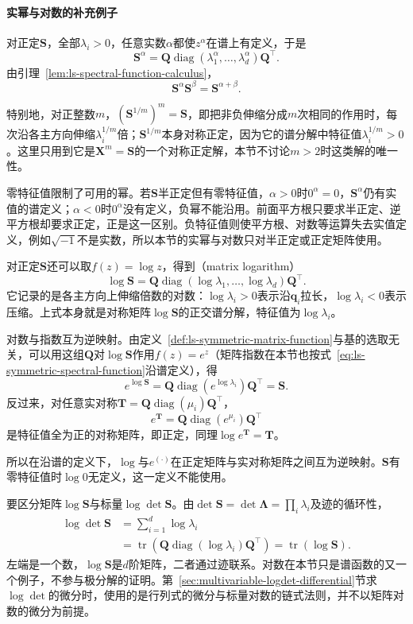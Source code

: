 \paragraph{实幂与对数的补充例子}

对正定$\bm S$，全部$\lambda_i>0$，任意实数$\alpha$都使$z^\alpha$在谱上有定义，于是
\[
 \bm S^\alpha=\bm Q\operatorname{diag}(\lambda_1^\alpha,\ldots,\lambda_d^\alpha)\bm Q^\top .
\]
由引理~\ref{lem:ls-spectral-function-calculus}，
\[
 \bm S^\alpha\bm S^\beta=\bm S^{\alpha+\beta}.
\]

特别地，对正整数$m$，$(\bm S^{1/m})^m=\bm S$，即把非负伸缩分成$m$次相同的作用时，每次沿各主方向伸缩$\lambda_i^{1/m}$倍；$\bm S^{1/m}$本身对称正定，因为它的谱分解中特征值$\lambda_i^{1/m}>0$。这里只用到它是$\bm X^m=\bm S$的一个对称正定解，本节不讨论$m>2$时这类解的唯一性。

零特征值限制了可用的幂。若$\bm S$半正定但有零特征值，$\alpha>0$时$0^\alpha=0$，$\bm S^\alpha$仍有实值的谱定义；$\alpha<0$时$0^\alpha$没有定义，负幂不能沿用。前面平方根只要求半正定、逆平方根却要求正定，正是这一区别。负特征值则使平方根、对数等运算失去实值定义，例如$\sqrt{-1}$不是实数，所以本节的实幂与对数只对半正定或正定矩阵使用。

对正定$\bm S$还可以取$f(z)=\log z$，得到（matrix logarithm）
\[
 \log\bm S=\bm Q\operatorname{diag}(\log\lambda_1,\ldots,\log\lambda_d)\bm Q^\top .
\]
它记录的是各主方向上伸缩倍数的对数：$\log\lambda_i>0$表示沿$\bm q_i$拉长，$\log\lambda_i<0$表示压缩。上式本身就是对称矩阵$\log\bm S$的正交谱分解，特征值为$\log\lambda_i$。

对数与指数互为逆映射。由定义~\ref{def:ls-symmetric-matrix-function}与基的选取无关，可以用这组$\bm Q$对$\log\bm S$作用$f(z)=e^z$（矩阵指数在本节也按式~\eqref{eq:ls-symmetric-spectral-function}沿谱定义），得
\[
 e^{\log\bm S}=\bm Q\operatorname{diag}(e^{\log\lambda_i})\bm Q^\top=\bm S .
\]
反过来，对任意实对称$\bm T=\bm Q\operatorname{diag}(\mu_i)\bm Q^\top$，
\[
 e^{\bm T}=\bm Q\operatorname{diag}(e^{\mu_i})\bm Q^\top
\]
是特征值全为正的对称矩阵，即正定，同理$\log e^{\bm T}=\bm T$。

所以在沿谱的定义下，$\log$与$e^{(\cdot)}$在正定矩阵与实对称矩阵之间互为逆映射。$\bm S$有零特征值时$\log0$无定义，这一定义不能使用。

要区分矩阵$\log\bm S$与标量$\log\det\bm S$。由$\det\bm S=\det\bm\Lambda=\prod_i\lambda_i$及迹的循环性，
\[
 \begin{aligned}
 \log\det\bm S
 &=\sum_{i=1}^d\log\lambda_i\\
 &=\operatorname{tr}(\bm Q\operatorname{diag}(\log\lambda_i)\bm Q^\top)
 =\operatorname{tr}(\log\bm S).
 \end{aligned}
\]
左端是一个数，$\log\bm S$是$d$阶矩阵，二者通过迹联系。对数在本节只是谱函数的又一个例子，不参与极分解的证明。第~\ref{sec:multivariable-logdet-differential}节求$\log\det$的微分时，使用的是行列式的微分与标量对数的链式法则，并不以矩阵对数的微分为前提。

